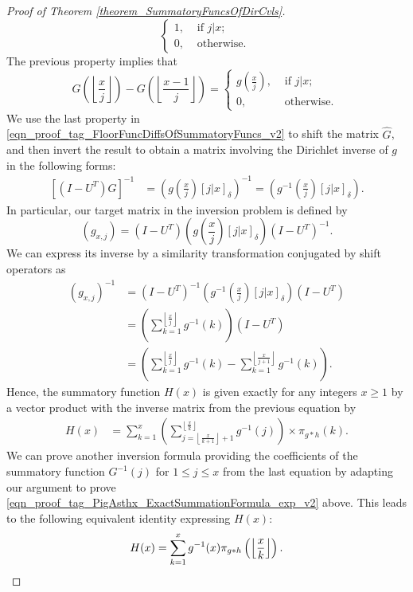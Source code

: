 \documentclass[11pt,reqno,a4letter]{article}
\numberwithin{figure}{section}
\numberwithin{table}{section}
\newcommand{\Iverson}[1]{\ensuremath{\left[#1\right]_{\delta}}}
\newcommand{\floor}[1]{\left\lfloor #1 \right\rfloor}
\newcommand{\Floor}[2]{\ensuremath{\left\lfloor \frac{#1}{#2} \right\rfloor}}
\theoremstyle{plain}
\numberwithin{theorem}{section}
\theoremstyle{definition}
\begin{document}
\begin{proof}[Proof of Theorem \ref{theorem_SummatoryFuncsOfDirCvls}]
\[\begin{cases}
     1, & \text{ if $j|x$; } \\ 
     0, & \text{ otherwise. } 
     \end{cases} 
\] 
The previous property implies that 
\begin{equation} 
\label{eqn_proof_tag_FloorFuncDiffsOfSummatoryFuncs_v2} 
G\left(\floor{\frac{x}{j}}\right) - G\left(\floor{\frac{x-1}{j}}\right) = 
     \begin{cases} 
     g\left(\frac{x}{j}\right), & \text{ if $j | x$; } \\ 
     0, & \text{ otherwise. } 
     \end{cases}
\end{equation} 
We use the last property in \eqref{eqn_proof_tag_FloorFuncDiffsOfSummatoryFuncs_v2} 
to shift the matrix $\hat{G}$, and then invert the result to obtain a matrix involving the 
Dirichlet inverse of $g$ in the following forms: 
\begin{align*} 
\left[(I-U^{T}) \hat{G}\right]^{-1} & = \left(g\left(\frac{x}{j}\right) \Iverson{j|x}\right)^{-1} = 
     \left(g^{-1}\left(\frac{x}{j}\right) \Iverson{j|x}\right). 
\end{align*} 
In particular, our target matrix in the inversion problem is defined by 
$$(g_{x,j}) = (I-U^{T}) \left(g\left(\frac{x}{j}\right) \Iverson{j|x}\right) (I-U^{T})^{-1}.$$
We can express its inverse by a similarity transformation conjugated by shift operators as 
\begin{align*} 
(g_{x,j})^{-1} & = (I-U^{T})^{-1} \left(g^{-1}\left(\frac{x}{j}\right) \Iverson{j|x}\right) (I-U^{T}) \\ 
     & = \left(\sum_{k=1}^{\floor{\frac{x}{j}}} g^{-1}(k)\right) (I-U^{T}) \\ 
     & = \left(\sum_{k=1}^{\floor{\frac{x}{j}}} g^{-1}(k) - \sum_{k=1}^{\floor{\frac{x}{j+1}}} g^{-1}(k)\right). 
\end{align*} 
Hence, the summatory function $H(x)$ is given exactly for any integers $x \geq 1$ 
by a vector product with the inverse matrix from the previous equation by 
\begin{align*} 
H(x) & = \sum_{k=1}^x \left(\sum_{j=\floor{\frac{x}{k+1}}+1}^{\floor{\frac{x}{k}}} g^{-1}(j)\right) 
     \times \pi_{g \ast h}(k). 
\end{align*} 
We can prove another inversion formula providing the coefficients of the summatory function 
$G^{-1}(j)$ for $1 \leq j \leq x$ from the last equation by adapting our argument to prove 
\eqref{eqn_proof_tag_PigAsthx_ExactSummationFormula_exp_v2} above. 
This leads to the following equivalent identity expressing $H(x)$: 
\[
H(x) = \sum_{k=1}^{x} g^{-1}(x) \pi_{g \ast h}\left(\Floor{x}{k}\right). 
     \qedhere 
\]
\end{proof} 
\end{document}
